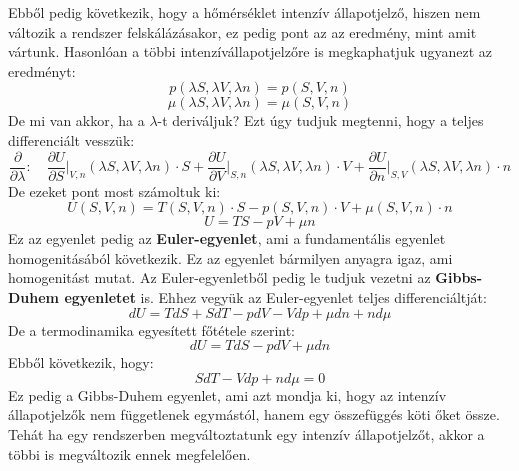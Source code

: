 \documentclass[a4paper,12pt]{article}
\begin{document}
Ebből pedig következik, hogy a hőmérséklet intenzív állapotjelző, hiszen nem változik a rendszer felskálázásakor, ez pedig pont az az eredmény, mint amit vártunk.
Hasonlóan a többi intenzívállapotjelzőre is megkaphatjuk ugyanezt az eredményt:
\begin{equation}
    p(\lambda S, \lambda V, \lambda n) = p (S, V, n)
\end{equation}
\begin{equation}
    \mu(\lambda S, \lambda V, \lambda n) = \mu (S, V, n)
\end{equation}
De mi van akkor, ha a $\lambda$-t deriváljuk? Ezt úgy tudjuk megtenni, hogy a teljes differenciált vesszük:
\begin{equation}
    \frac{\partial}{\partial \lambda}: \quad \frac{\partial U}{\partial S}\bigg|_{V,n} (\lambda S, \lambda V, \lambda n) \cdot S + \frac{\partial U}{\partial V}\bigg|_{S,n} (\lambda S, \lambda V, \lambda n) \cdot V + \frac{\partial U}{\partial n}\bigg|_{S,V} (\lambda S, \lambda V, \lambda n) \cdot n
\end{equation}
De ezeket pont most számoltuk ki:
\begin{equation}
    U(S, V, n) = T(S, V, n) \cdot S - p(S, V, n) \cdot V + \mu(S, V, n) \cdot n
\end{equation} 
\begin{equation}
    \boxed{U = T S - p V + \mu n}
\end{equation}
Ez az egyenlet pedig az \textbf{Euler-egyenlet}, ami a fundamentális egyenlet homogenitásából következik. Ez az egyenlet bármilyen anyagra igaz,
ami homogenitást mutat. Az Euler-egyenletből pedig le tudjuk vezetni az \textbf{Gibbs-Duhem egyenletet} is. Ehhez vegyük az Euler-egyenlet teljes differenciáltját:
\begin{equation}
    dU = T dS + S dT - p dV - V dp + \mu dn + n d\mu
\end{equation}
De a termodinamika egyesített főtétele szerint:
\begin{equation}
    dU = T dS - p dV + \mu dn
\end{equation}
Ebből következik, hogy:
\begin{equation}
    S dT - V dp + n d\mu = 0
\end{equation}
Ez pedig a Gibbs-Duhem egyenlet, ami azt mondja ki, hogy az intenzív állapotjelzők nem függetlenek egymástól, hanem egy összefüggés köti őket össze.
Tehát ha egy rendszerben megváltoztatunk egy intenzív állapotjelzőt, akkor a többi is megváltozik ennek megfelelően.
\end{document}
